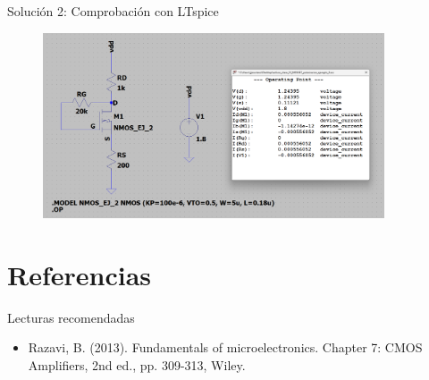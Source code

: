 \documentclass[t,aspectratio=169]{beamer}
\begin{document}
\begin{frame}{Solución 2: Comprobación con LTspice}

\begin{figure}
    \centering
    \includegraphics[width=0.9\textwidth]{figuras/ltspice_ejemplo_2.png}
\end{figure}
    
\end{frame}


\section{Referencias}
\begin{frame}{Lecturas recomendadas}

\begin{itemize}
    \item Razavi, B. (2013). Fundamentals of microelectronics. Chapter 7: CMOS Amplifiers, 2nd ed., pp. 309-313, Wiley.
\end{itemize}

\end{frame}
\end{document}
